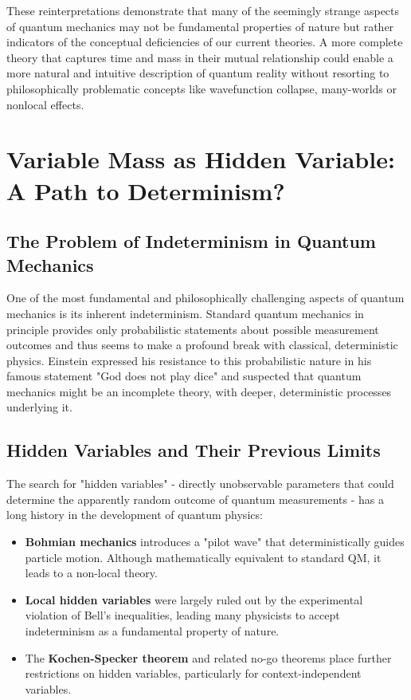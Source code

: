 \documentclass[12pt,a4paper]{article}  %
\begin{document}
	These reinterpretations demonstrate that many of the seemingly strange aspects of quantum mechanics may not be fundamental properties of nature but rather indicators of the conceptual deficiencies of our current theories. A more complete theory that captures time and mass in their mutual relationship could enable a more natural and intuitive description of quantum reality without resorting to philosophically problematic concepts like wavefunction collapse, many-worlds or nonlocal effects.
	
	\section{Variable Mass as Hidden Variable: A Path to Determinism?}
	
	\subsection{The Problem of Indeterminism in Quantum Mechanics}
	
	One of the most fundamental and philosophically challenging aspects of quantum mechanics is its inherent indeterminism. Standard quantum mechanics in principle provides only probabilistic statements about possible measurement outcomes and thus seems to make a profound break with classical, deterministic physics. Einstein expressed his resistance to this probabilistic nature in his famous statement "God does not play dice" and suspected that quantum mechanics might be an incomplete theory, with deeper, deterministic processes underlying it.
	
	\subsection{Hidden Variables and Their Previous Limits}
	
	The search for "hidden variables" - directly unobservable parameters that could determine the apparently random outcome of quantum measurements - has a long history in the development of quantum physics:
	
	\begin{itemize}
		\item \textbf{Bohmian mechanics} introduces a "pilot wave" that deterministically guides particle motion. Although mathematically equivalent to standard QM, it leads to a non-local theory.
		
		\item \textbf{Local hidden variables} were largely ruled out by the experimental violation of Bell's inequalities, leading many physicists to accept indeterminism as a fundamental property of nature.
		
		\item The \textbf{Kochen-Specker theorem} and related no-go theorems place further restrictions on hidden variables, particularly for context-independent variables.
	\end{itemize}
	
\end{document}
